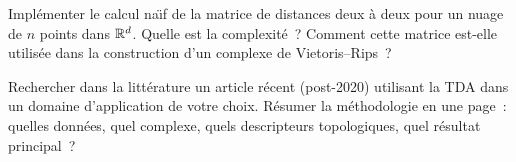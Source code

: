 \begin{exercice}
Impl\'ementer le calcul na\"{\i}f de la matrice de distances deux \`a
deux pour un nuage de $n$ points dans $\mathbb{R}^d$. Quelle est la
complexit\'e~? Comment cette matrice est-elle utilis\'ee dans la
construction d'un complexe de Vietoris--Rips~?
\end{exercice}

\begin{exercice}
Rechercher dans la litt\'erature un article r\'ecent (post-2020)
utilisant la TDA dans un domaine d'application de votre choix.
R\'esumer la m\'ethodologie en une page~: quelles donn\'ees, quel
complexe, quels descripteurs topologiques, quel r\'esultat principal~?
\end{exercice}

